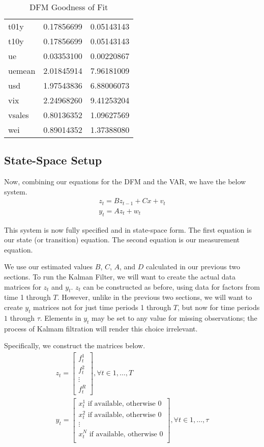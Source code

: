 \documentclass[11pt, letterpaper]{article}\usepackage[]{graphicx}\usepackage[]{color}
\begin{document}
\begin{table}[H]
\begin{tabular}{lrr}
  t01y & 0.17856699 & 0.05143143 \\ 
  t10y & 0.17856699 & 0.05143143 \\ 
  ue & 0.03353100 & 0.00220867 \\ 
  uemean & 2.01845914 & 7.96181009 \\ 
  usd & 1.97543836 & 6.88006073 \\ 
  vix & 2.24968260 & 9.41253204 \\ 
  vsales & 0.80136352 & 1.09627569 \\ 
  wei & 0.89014352 & 1.37388080 \\ 
   \hline
\end{tabular}
\endgroup
\caption{DFM Goodness of Fit} 
\end{table}





\subsection{State-Space Setup}
Now, combining our equations for the DFM and the VAR, we have the below system.
\begin{align*}
z_t = B z_{t-1} + Cx + v_t\\
y_t = A z_t + w_t
\end{align*}

This system is now fully specified and in state-space form. The first equation is our state (or transition) equation. The second equation is our measurement equation. 

We use our estimated values $B$, $C$, $A$, and $D$ calculated in our previous two sections. To run the Kalman Filter, we will want to create the actual data matrices for $z_t$ and $y_t$. $z_t$ can be constructed as before, using data for factors from time 1 through $T$. However, unlike in the previous two sections, we will want to create $y_t$ matrices not for just time periods 1 through $T$, but now for time periods $1$ through $\tau$. Elements in $y_t$ may be set to any value for missing observations; the process of Kalmam filtration will render this choice irrelevant.

Specifically, we construct the matrices below.
\begin{align*}
z_t
=
\begin{bmatrix}
	f^1_{t}\\
	f^2_{t}\\
	\vdots \\
	f^R_{t}
\end{bmatrix}, \forall t \in 1, \dots, T\\
y_t
=
\begin{bmatrix}
	\text{$x^1_{t}$ if available, otherwise 0}\\
	\text{$x^2_{t}$ if available, otherwise 0}\\
	\vdots \\
	\text{$x^N_{t}$ if available, otherwise 0}\\
\end{bmatrix}, \forall t \in 1, \dots, \tau
\end{align*}
\end{document}
